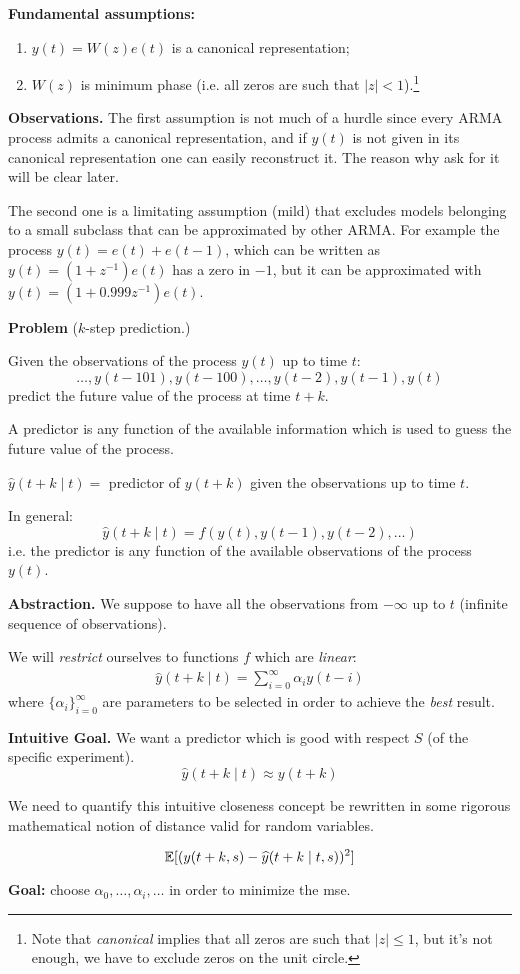 \textbf{Fundamental assumptions:}\label{assumptions-prediction-theory}
\begin{enumerate}
	\item $y(t) = W(z)e(t)$ is a canonical representation;
	\item $W(z)$ is minimum phase (i.e. all zeros are such that $|z|<1$).\footnote{Note that \emph{canonical} implies that all zeros are such that $|z|\leq 1$, but it's not enough, we have to exclude zeros on the unit circle.}
\end{enumerate}
 
\textbf{Observations.}
The first assumption is not much of a hurdle since every ARMA process admits a canonical representation, and if $y(t)$ is not given in its canonical representation one can easily reconstruct it. The reason why ask for it will be clear later. 

The second one is a limitating assumption (mild) that excludes models belonging to a small subclass that can be approximated by other ARMA. For example the process $y(t)=e(t)+e(t-1)$, which can be written as $y(t)=(1+z^{-1})e(t)$ has a zero in $-1$, but it can be approximated with $y(t)=(1+0.999z^{-1})e(t)$.

\textbf{Problem} ($k$-step prediction.)

Given the observations of the process $y(t)$ up to time $t$:
$$
	\ldots , y(t-101), y(t-100), \ldots , y(t-2), y(t-1), y(t)
$$
predict the future value of the process at time $t + k$.


A predictor is any function of the available information which is used to guess the future value of the process.

$\hat{y}(t + k \mid t) =$ predictor of $y(t + k)$ given the observations up to time $t$.

In general: 
$$\hat{y}(t + k \mid t) = f ( y(t), y(t-1), y(t-2),\ldots)$$
i.e. the predictor is any function of the available observations of the process $y(t)$.

\textbf{Abstraction.} We suppose to have all the observations from $-\infty$ up to $t$ (infinite sequence of observations).

We will \emph{restrict} ourselves to functions $f$ which are \emph{linear}:
\begin{align*}
	\hat{y}(t + k \mid t)=\sum_{i=0}^{\infty}\alpha_i y(t-i)
\end{align*}
where ${\{\alpha_i\}}_{i=0}^\infty$ are parameters to be selected in order to achieve the \emph{best} result.

\textbf{Intuitive Goal.} 
We want a predictor which is good with respect $S$ (of the specific experiment).
\[
	\hat{y}(t + k \mid t)\approx y(t+k)
\]

We need to quantify this intuitive closeness concept be rewritten in some rigorous mathematical notion of distance valid for random variables.

\begin{definition}
	\[
		\mathbb{E}[(y(t+k,s)-\widehat{y}(t+k\mid t,s))^2]
	\]
\end{definition}

\textbf{Goal:} choose $\alpha_0,\ldots,\alpha_i,\ldots$ in order to minimize the \gls{mse}.